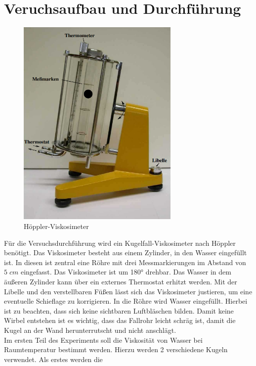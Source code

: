 \section{Veruchsaufbau und Durchführung}
\label{sec:Veruchsaufbau}

\begin{figure}[H]
    \centering
    \includegraphics[width=0.7\textwidth]{bilder/hoeppler_viskosimeter.png}
    \caption{Höppler-Viskosimeter\protect\footnotemark}
    \label{fig:hoeppler}
\end{figure}
Für die Versuchsdurchführung wird ein Kugelfall-Viskosimeter nach Höppler benötigt. Das Viskosimeter besteht aus einem Zylinder, in den Wasser eingefüllt ist. 
In diesen ist zentral eine Röhre mit drei Messmarkierungen im Abstand von $5\;\unit{cm}$ eingefasst. Das Viskosimeter ist um 180° drehbar.
Das Wasser in dem äußeren Zylinder kann über ein externes Thermostat erhitzt werden. Mit der Libelle und den verstellbaren Füßen lässt sich das Viskosimeter justieren, um
eine eventuelle Schieflage zu korrigieren. In die Röhre wird Wasser eingefüllt. Hierbei ist zu beachten, dass sich keine sichtbaren Luftbläschen bilden.
Damit keine Wirbel entstehen ist es wichtig, dass das Fallrohr leicht schräg ist, damit die Kugel an der Wand herunterrutscht und nicht anschlägt.
\\
Im ersten Teil des Experiments soll die Viskosität von Wasser bei Raumtemperatur bestimmt werden. Hierzu werden 2 verschiedene Kugeln verwendet. Als erstes werden die 
